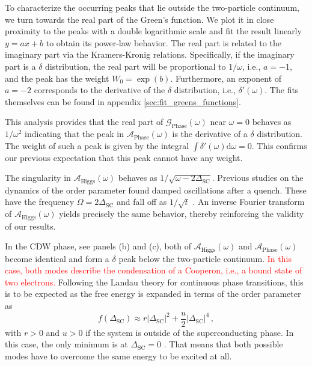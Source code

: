 \documentclass[
    reprint, 
    aps,
    preprintnumbers,
    twocolumn,
    prb,
    superscriptaddress
]{revtex4-2}
\newcommand{\greens}[1]{\mathcal{G}_\text{#1} (\omega)}
\newcommand{\spectral}[1]{\mathcal{A}_\text{#1}  (\omega)}
\begin{document}
To characterize the occurring peaks that lie outside the two-particle continuum, we turn towards the real part of the Green's function.
We plot it in close proximity to the peaks with a double logarithmic scale and fit the result linearly $y = ax + b$ to obtain its power-law behavior.
The real part is related to the imaginary part via the Kramers-Kronig relations.
Specifically, if the imaginary part is a $\delta$ distribution, the real part will be proportional to $1/\omega$, i.e., $a=-1$, and the peak has the weight $W_0 = \exp(b)$.
Furthermore, an exponent of $a=-2$ corresponds to the derivative of the $\delta$ distribution, i.e., $\delta'(\omega)$.
The fits themselves can be found in appendix \ref{sec:fit_greens_functions}.

This analysis provides that the real part of $\greens{Phase}$ near $\omega=0$ behaves as $1/\omega^2$ indicating that the peak in $\spectral{Phase}$ is the derivative of a $\delta$ distribution.
The weight of such a peak is given by the integral $\int \delta'(\omega) \mathrm{d}\omega = 0$.
This confirms our previous expectation that this peak cannot have any weight.

The singularity in $\spectral{Higgs}$ behaves as $1/\sqrt{\omega - 2 \Delta_\text{SC}}$.
Previous studies on the dynamics of the order parameter found damped oscillations after a quench.
These have the frequency $\Omega = 2 \Delta_\text{SC}$ and fall off as $1/\sqrt{t}$ \cite{Volkov73,Kulik1981,Yuzbashyan06}.
An inverse Fourier transform of $\spectral{Higgs}$ yields precisely the same behavior, thereby reinforcing the validity of our results.

In the CDW phase, see panels (b) and (c), both of $\spectral{Higgs}$ and $\spectral{Phase}$ become identical and form a $\delta$ peak below the two-particle continuum.
\textcolor{red}{In this case, both modes describe the condensation of a Cooperon, i.e., a bound state of two electrons.}
Following the Landau theory for continuous phase transitions, this is to be expected as the free energy is expanded in terms of the order parameter as
\begin{equation}
    f(\Delta_\text{SC}) \approx r |\Delta_\text{SC}|^2 + \frac{u}{2} |\Delta_\text{SC}|^4\,,
\end{equation}
with $r > 0$ and $u > 0$ if the system is outside of the superconducting phase. 
In this case, the only minimum is at $\Delta_\text{SC} = 0$ \cite{Coleman2015}. 
That means that both possible modes have to overcome the same energy to be excited at all. 
\end{document}

